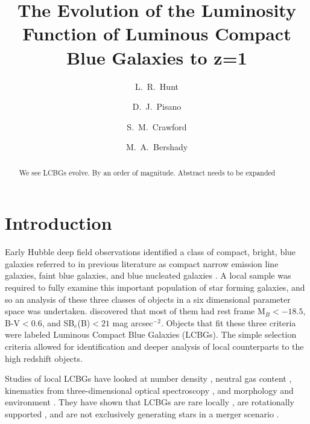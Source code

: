 \documentclass[manuscript]{aastex61}
\begin{document}
\title{The Evolution of the Luminosity Function of Luminous Compact Blue Galaxies to z=1}

\author{L.~R.~Hunt}
\author{D.~J.~Pisano}
\author{S.~M.~Crawford}
\author{M.~A.~Bershady}

\begin{abstract}
We see LCBGs evolve. By an order of magnitude. Abstract needs to be expanded
\end{abstract}


\section{Introduction}

Early Hubble deep field observations identified a class of compact, bright, blue galaxies referred to in previous literature as compact narrow emission line galaxies, faint blue galaxies, and blue nucleated galaxies \citep{1994ApJ...427L...9K, 1996ApJ...460L...5G,1998ApJ...495L..13G, 1995ApJ...440L..49K,1997ApJ...489..559G,1997ApJ...489..543P,1995ApJ...451L...1S,1996ApJ...464...79S}. A local sample was required to fully examine this important population of star forming galaxies, and so an analysis of these three classes of objects in a six dimensional parameter space was undertaken. \citet{2004ApJ...617.1004W} discovered that most of them had rest frame M$_{B}<-18.5$, B-V$<$0.6, and SB$_{e}$(B)$<21$ mag arcsec$^{-2}$. Objects that fit these three criteria were labeled Luminous Compact Blue Galaxies (LCBGs). The simple selection criteria allowed for identification and deeper analysis of local counterparts to the high redshift objects.    

Studies of local LCBGs have looked at number density \citep{2004ApJ...617.1004W}, neutral gas content \citep{2007ApJ...671..310G,2014arXiv1412.4739R}, kinematics from three-dimensional optical spectroscopy \citep{2011MNRAS.418.2350P}, and morphology and environment \citet{2015ApJ...807..134G}. They have shown that LCBGs are rare locally \citep{2004ApJ...617.1004W}, are rotationally supported \citep{2014arXiv1412.4739R, 2011MNRAS.418.2350P}, and are not exclusively generating stars in a merger scenario \citep{2014arXiv1412.4739R,2015ApJ...807..134G, 2011MNRAS.418.2350P}. 
\end{document}
